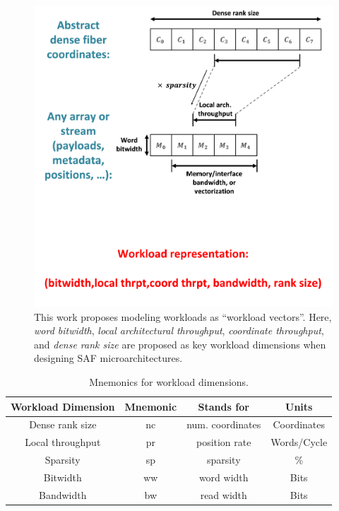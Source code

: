 \begin{figure}[H]
    \centering
    \includegraphics[width=\linewidth]{figures/workload_representation.png}
    \caption{This work proposes modeling workloads as ``workload vectors''. Here, \textit{word bitwidth},  \textit{local architectural throughput}, \textit{coordinate throughput}, and \textit{dense rank size} are proposed as key workload dimensions when designing SAF microarchitectures.}
    \label{fig:workload_representation}
\end{figure}

    \begin{table}[h]
        \centering
        \caption{Mnemonics for workload dimensions.}
        \label{table:workload_dimension_mnemonics}
        \begin{tabular}{||c|c|c|c||}
            \hline \hline
            Workload Dimension & Mnemonic & Stands for & Units \\
            \hline \hline
            Dense rank size & nc & num. coordinates & Coordinates \\
            \hline
            Local throughput & pr & position rate & Words/Cycle \\
            \hline
            Sparsity & sp & sparsity & \% \\
            \hline
            Bitwidth & ww & word width & Bits \\
            \hline
            Bandwidth & bw & read width & Bits \\
            \hline \hline
        \end{tabular}
    \end{table}

